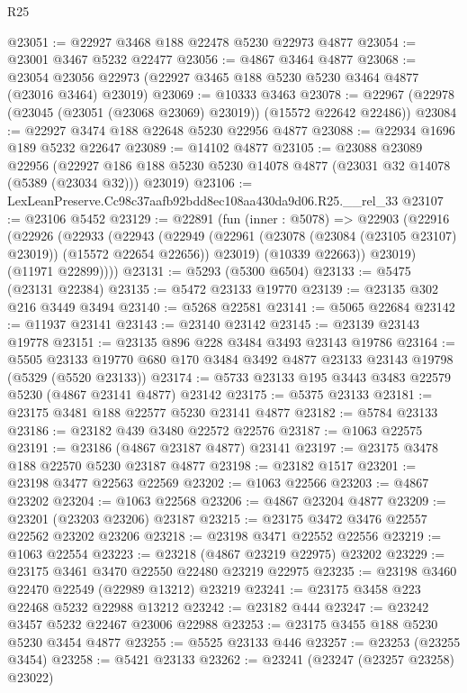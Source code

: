 \begin{lexlean}{R25}
\begin{coremodule}
@23051 := @22927 @3468 @188 @22478 @5230 @22973 @4877
@23054 := @23001 @3467 @5232 @22477
@23056 := @4867 @3464 @4877
@23068 := @23054 @23056 @22973 (@22927 @3465 @188 @5230 @5230 @3464 @4877 (@23016 @3464) @23019)
@23069 := @10333 @3463
@23078 := @22967 (@22978 (@23045 (@23051 (@23068 @23069) @23019)) (@15572 @22642 @22486))
@23084 := @22927 @3474 @188 @22648 @5230 @22956 @4877
@23088 := @22934 @1696 @189 @5232 @22647
@23089 := @14102 @4877
@23105 := @23088
    @23089
    @22956
    (@22927 @186 @188 @5230 @5230 @14078 @4877 (@23031 @32 @14078 (@5389 (@23034 @32))) @23019)
@23106 := LexLeanPreserve.Cc98c37aafb92bdd8ec108aa430da9d06.R25.__rel_33
@23107 := @23106 @5452
@23129 := @22891
    (fun (inner : @5078) =>
    @22903
      (@22916
        (@22926
          (@22933
            (@22943
              (@22949
                (@22961 (@23078 (@23084 (@23105 @23107) @23019)) (@15572 @22654 @22656))
                @23019)
              (@10339 @22663))
            @23019)
          (@11971 @22899))))
@23131 := @5293 (@5300 @6504)
@23133 := @5475 (@23131 @22384)
@23135 := @5472 @23133 @19770
@23139 := @23135 @302 @216 @3449 @3494
@23140 := @5268 @22581
@23141 := @5065 @22684
@23142 := @11937 @23141
@23143 := @23140 @23142
@23145 := @23139 @23143 @19778
@23151 := @23135 @896 @228 @3484 @3493 @23143 @19786
@23164 := @5505
    @23133
    @19770
    @680
    @170
    @3484
    @3492
    @4877
    @23133
    @23143
    @19798
    (@5329 (@5520 @23133))
@23174 := @5733 @23133 @195 @3443 @3483 @22579 @5230 (@4867 @23141 @4877) @23142
@23175 := @5375 @23133
@23181 := @23175 @3481 @188 @22577 @5230 @23141 @4877
@23182 := @5784 @23133
@23186 := @23182 @439 @3480 @22572 @22576
@23187 := @1063 @22575
@23191 := @23186 (@4867 @23187 @4877) @23141
@23197 := @23175 @3478 @188 @22570 @5230 @23187 @4877
@23198 := @23182 @1517
@23201 := @23198 @3477 @22563 @22569
@23202 := @1063 @22566
@23203 := @4867 @23202
@23204 := @1063 @22568
@23206 := @4867 @23204 @4877
@23209 := @23201 (@23203 @23206) @23187
@23215 := @23175 @3472 @3476 @22557 @22562 @23202 @23206
@23218 := @23198 @3471 @22552 @22556
@23219 := @1063 @22554
@23223 := @23218 (@4867 @23219 @22975) @23202
@23229 := @23175 @3461 @3470 @22550 @22480 @23219 @22975
@23235 := @23198 @3460 @22470 @22549 (@22989 @13212) @23219
@23241 := @23175 @3458 @223 @22468 @5232 @22988 @13212
@23242 := @23182 @444
@23247 := @23242 @3457 @5232 @22467 @23006 @22988
@23253 := @23175 @3455 @188 @5230 @5230 @3454 @4877
@23255 := @5525 @23133 @446
@23257 := @23253 (@23255 @3454)
@23258 := @5421 @23133
@23262 := @23241 (@23247 (@23257 @23258) @23022)

\end{coremodule}
\end{lexlean}
